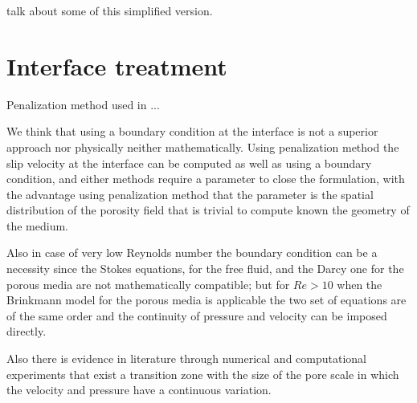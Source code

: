 \citet{kozeny} talk about some of this simplified version.


\section{Interface treatment}
\label{ch:interface}
Penalization method \citet{angot1999penalization} used in\cite{bruneau2004passive} \cite{bruneau2008numerical} \cite{bruneau2010coupling}...


We think that using a boundary condition at the interface is not a superior approach nor physically neither mathematically.
Using penalization method the slip velocity at the interface can be computed as well as using a boundary condition, and either methods require a parameter to close the formulation, with the advantage using penalization method that the parameter is the spatial distribution of the porosity field that is trivial to compute known the geometry of the medium.

Also in case of very low Reynolds number the boundary condition can be a necessity since the Stokes equations, for the free fluid, and the Darcy one for the porous media are not mathematically compatible; but for $Re>10$ when the Brinkmann model for the porous media is applicable the two set of equations are of the same order and the continuity of pressure and velocity can be imposed directly.

Also there is evidence in literature through numerical and computational experiments \citet{ochoa2017fluid} that exist a transition zone with the size of the pore scale in which the velocity and pressure have a continuous variation.
